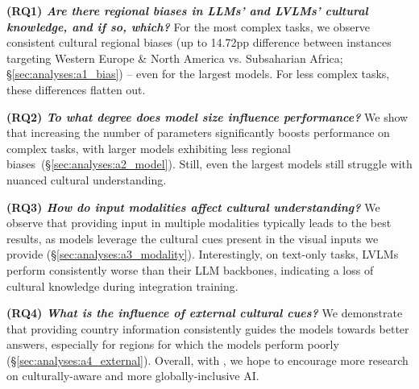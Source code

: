 \noindent\textbf{(RQ1) \emph{Are there regional biases in LLMs' and LVLMs' cultural knowledge, and if so, which?}} For the most complex tasks, we observe consistent cultural regional biases (up to 14.72pp difference between instances targeting Western Europe \& North America vs. Subsaharian Africa; \S\ref{sec:analyses:a1_bias}) -- even for the largest models. For less complex tasks, these differences flatten out. 

\noindent\textbf{(RQ2) \emph{To what degree does model size influence performance?}} %
We show that increasing the number of parameters significantly boosts performance on complex tasks, with larger models exhibiting less regional biases~(\S\ref{sec:analyses:a2_model}). Still, even the largest models still struggle with nuanced cultural understanding.

\noindent\textbf{(RQ3) \emph{How do input modalities affect cultural understanding?}} We observe that providing input in multiple modalities typically leads to the best results, as models leverage the cultural cues present in the visual inputs we provide (\S\ref{sec:analyses:a3_modality}). Interestingly, on text-only tasks, LVLMs perform consistently worse than their LLM backbones, indicating a loss of cultural knowledge during integration training. 

\noindent\textbf{(RQ4) \emph{What is the influence of external cultural cues?}} We demonstrate that providing country information consistently guides the models towards better answers, especially for regions for which the models perform poorly (\S\ref{sec:analyses:a4_external}). 
%
%
%
%
Overall, with \dsname, we hope to encourage more research on culturally-aware and more globally-inclusive AI. %
%